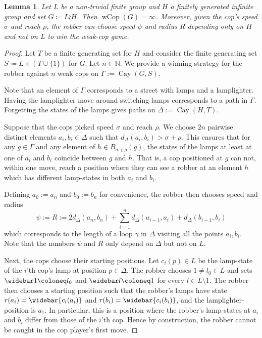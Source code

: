 \documentclass{amsart}
\newtheorem{lemma}[theorem]{Lemma}
\theoremstyle{definition}
\theoremstyle{remark}
\theoremstyle{remark}
\theoremstyle{definition}
\newcommand{\wCop}{\operatorname{wCop}}
\newcommand{\Cay}{\operatorname{Cay}}
\newcommand{\N}{\mathbb{N}}
\begin{document}
\begin{lemma}\label{lem:wcop(lamplighter)}
	Let \(L\) be a non-trivial finite group and \(H\) a finitely generated infinite group and set \(G \coloneq L \wr H\).
	Then \(\wCop(G) = \infty\). Moreover, given the cop's speed $\sigma$ and reach $\rho$, the robber can choose speed $\psi$ and radius $R$ depending only on $H$ and not on $L$ to win the weak-cop game.
\end{lemma}
\begin{proof}
	Let \(T\) be a finite generating set for \(H\) and consider the finite generating set \(S \coloneq L \times (T \cup \{1\})\) for $G$.
	Let \(n \in \N\). We provide a winning strategy for the robber against \(n\) weak cops on \( \Gamma := \Cay(G,S)\).

	Note that an element of \(\Gamma\) corresponds to a street with lamps and a lamplighter. Having the lamplighter move around switching lamps corresponds to a path in \(\Gamma\). Forgetting the states of the lamps gives paths on $\Delta := \Cay(H,T)$.

	Suppose that the cops picked speed \(\sigma\) and reach \(\rho\). 
	We choose \(2n\) pairwise distinct elements \(a_i, b_i \in \Delta\) such that \(d_\Delta(a_i, b_i) > \sigma + \rho\). This ensures that for any \(g \in \Gamma\) and any element of \(h \in B_{\sigma + \rho}(g)\), the states of the lamps at least at one of \(a_i\) and \(b_i\) coincide between \(g\) and \(h\).
	That is, a cop positioned at \(g\) can not, within one move, reach a position where they can see a robber at an element \(h\) which has different lamp-states in both \(a_i\) and \(b_i\).

	Defining $a_0:= a_n$ and $b_0:= b_n$ for convenience, the robber then chooses speed and radius
    $$
    \psi := R:= 2 d_\Delta(a_n, b_n) +  \sum_{i=1}^{n} d_\Delta(a_{i-1},a_i) + d_\Delta(b_{i-1}, b_i)
    $$
    which corresponds to the length of a loop $\gamma$ in $\Delta$ visiting all the points $a_i, b_i$. Note that the numbers $\psi$ and $R$ only depend on $\Delta$ but not on $L$.

    Next, the cops choose their starting positions.
    Let $c_i(p)\in L$ be the lamp-state of the $i$'th cop's lamp at position $p \in \Delta$. The robber chooses \(1 \neq l_0 \in L\) and sets \(\widebar 1 \coloneq l_0\) and \(\widebar l \coloneq 1\) for every \(l \in L \setminus 1\). The robber then chooses a starting position such that the robber's lamps have state $r(a_i)=\widebar{c_i(a_i)}$ and $r(b_i)=\widebar{c_i(b_i)}$, and the lamplighter-position is $a_1$.
	In particular, this is a position where the robber's lamp-states at \(a_i\) and \(b_i\) differ from those of the \(i\)'th cop.
	Hence by construction, the robber cannot be caught in the cop player's first move.


\end{proof}
\end{document}
